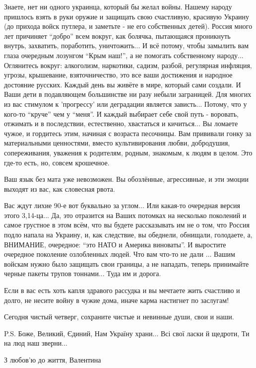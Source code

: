 Знаете, нет ни одного украинца, который бы желал войны. Нашему народу пришлось
взять в руки оружие и защищать свою счастливую, красивую Украину (до прихода
войск путлера, и заметьте - не его собственных детей). Россия много лет
причиняет \enquote{добро} всем вокруг, как болячка, пытающаяся проникнуть
внутрь, захватить, поработить, уничтожить... И всё потому, чтобы замылить вам
глаза очередным лозунгом \enquote{Крым наш!}, а не помогать собственному
народу... Оглянитесь вокруг: алкоголизм, наркотики, садизм, разбой, регулярная
инфляция, угрозы, крышевание, взяточничество, это все ваши достижения и
народное достояние русских. Каждый день вы живёте в мире, который сами создали.
И Ваши дети в подавляющем большинстве ни разу небыли заграницей. Для многих из
вас стимулом к 'прогрессу' или деградации является зависть... Потому, что у
кого-то \enquote{круче} чем у \enquote{меня}. И каждый выбирает себе свой путь
- воровать, отжимать и в последствии, естественно, хвастаться и кичиться... Вы
ломаете чужое, и гордитесь этим, начиная с возраста песочницы. Вам прививали
гонку за материальными ценностями, вместо культивирования любви, добродушия,
сопереживания, уважения к родителям, родным, знакомым, к людям в целом. Это
где-то есть, но, совсем крошечное. 

Ваш язык без мата уже невозможен. Вы обозлённые, агрессивные, и эти эмоции
выходят из вас, как словесная рвота.

Вас ждут лихие 90-е вот буквально за углом... Или какая-то очередная версия
этого 3,14-ца... Да, это отразится на Ваших потомках на несколько поколений и
самое грустное в этом всём, что вы будете рассказывать им не о том, что Россия
подло напала на Украину, и, как следствие, вы обеднели, обнищали, голодаете, а,
ВНИМАНИЕ, очередное: \enquote{это НАТО и Америка виноваты}. И выростите очередное
поколение озлобленных людей. Что вам что-то не дали ... Вашим войскам нужно
было защищать свои границы, а не нападать, теперь принимайте черные пакеты
трупов тоннами... Туда им и дорога.

Если в вас есть хоть капля здравого рассудка и вы мечтаете жить счастливо и
долго, не несите войну в чужие дома, иначе карма настигнет по заслугам!

Сегодня чистый четверг, сохраните чистые и невинные души, свои и наши.

\obeycr
P.S. Боже, Великий, Єдиний,
Нам Україну храни...
Всі свої ласки й щедроти,
Ти на люд наш зверни...
\restorecr

З любов'ю до життя, Валентина
